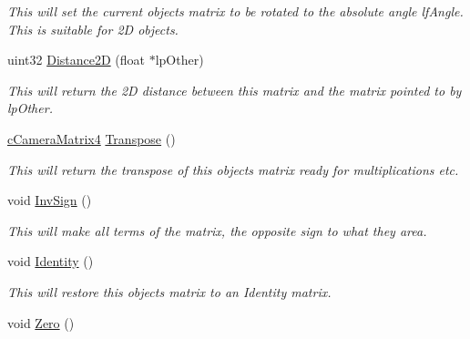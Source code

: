 \begin{DoxyCompactItemize}
\begin{DoxyCompactList}\small\item\em This will set the current objects matrix to be rotated to the absolute angle lfAngle. This is suitable for 2D objects. \end{DoxyCompactList}\item 
\hypertarget{classc_camera_matrix4_a02c68197ed3c64c95985269f5b9f66a4}{
uint32 \hyperlink{classc_camera_matrix4_a02c68197ed3c64c95985269f5b9f66a4}{Distance2D} (float $\ast$lpOther)}
\label{classc_camera_matrix4_a02c68197ed3c64c95985269f5b9f66a4}

\begin{DoxyCompactList}\small\item\em This will return the 2D distance between this matrix and the matrix pointed to by lpOther. \end{DoxyCompactList}\item 
\hypertarget{classc_camera_matrix4_ac1fa4dd9add669a8faecd0ca79713278}{
\hyperlink{classc_camera_matrix4}{cCameraMatrix4} \hyperlink{classc_camera_matrix4_ac1fa4dd9add669a8faecd0ca79713278}{Transpose} ()}
\label{classc_camera_matrix4_ac1fa4dd9add669a8faecd0ca79713278}

\begin{DoxyCompactList}\small\item\em This will return the transpose of this objects matrix ready for multiplications etc. \end{DoxyCompactList}\item 
\hypertarget{classc_camera_matrix4_a97d111c444dd87ecec278e585fe058a7}{
void \hyperlink{classc_camera_matrix4_a97d111c444dd87ecec278e585fe058a7}{InvSign} ()}
\label{classc_camera_matrix4_a97d111c444dd87ecec278e585fe058a7}

\begin{DoxyCompactList}\small\item\em This will make all terms of the matrix, the opposite sign to what they area. \end{DoxyCompactList}\item 
\hypertarget{classc_camera_matrix4_a23a05c1aff8a58dc662f5b871b422c17}{
void \hyperlink{classc_camera_matrix4_a23a05c1aff8a58dc662f5b871b422c17}{Identity} ()}
\label{classc_camera_matrix4_a23a05c1aff8a58dc662f5b871b422c17}

\begin{DoxyCompactList}\small\item\em This will restore this objects matrix to an Identity matrix. \end{DoxyCompactList}\item 
\hypertarget{classc_camera_matrix4_a1ec81a7ec3274f89d2b8fb94923345c0}{
void \hyperlink{classc_camera_matrix4_a1ec81a7ec3274f89d2b8fb94923345c0}{Zero} ()}
\label{classc_camera_matrix4_a1ec81a7ec3274f89d2b8fb94923345c0}


\end{DoxyCompactItemize}
